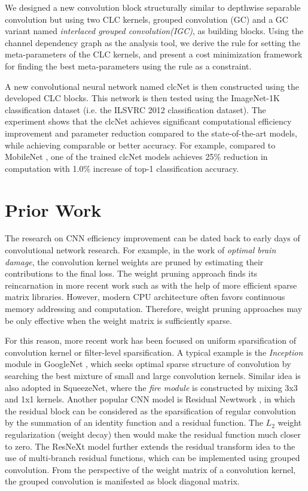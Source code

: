\documentclass[10pt,twocolumn,letterpaper]{article}
\begin{document}
We designed a new convolution block structurally similar to depthwise separable convolution \cite{xception2017chollet} but using two CLC kernels, grouped convolution (GC) and a GC variant named \textit{interlaced grouped convolution(IGC)},  as building blocks. Using the channel dependency graph as the analysis tool, we derive the rule for setting the meta-parameters of the CLC kernels, and present a cost minimization framework for finding the best meta-parameters using the rule as a constraint.

A new convolutional neural network named clcNet is then constructed using the developed CLC blocks. This network is then tested using the ImageNet-1K classification dataset (i.e. the ILSVRC 2012\cite{ilsvrc2015olga} classification dataset). The experiment shows that the clcNet achieves significant computational efficiency improvement and parameter reduction compared to the  state-of-the-art models, while achieving comparable or better accuracy. For example, compared to MobileNet \cite{mobilenet2017howard}, one of the trained clcNet models achieves 25\% reduction in computation with 1.0\% increase of top-1 classification accuracy.
\section{Prior Work}

The research on CNN efficiency improvement can be dated back to early days of convolutional network research. For example, in the work of \textit{optimal brain damage}\cite{prune1990Lecun1990}, the convolution kernel weights are pruned by estimating their contributions to the final loss. The weight pruning approach finds its reincarnation in more recent work such as \cite{compression2015song} with the help of more efficient sparse matrix libraries. However, modern CPU architecture often favors continuous memory addressing and computation. Therefore, weight pruning approaches may be only effective when the weight matrix is sufficiently sparse.

For this reason, more recent work has been focused on uniform sparsification of convolution kernel or filter-level sparsification. A typical example is the \textit{Inception} module in GoogleNet \cite{inception2015szegedy}, which seeks optimal sparse structure of convolution by searching the best mixture of small and large convolution kernels. Similar idea is also adopted in SqueezeNet\cite{squeezenet2016iandola}, where the \textit{fire module }is constructed by mixing 3x3 and 1x1 kernels. Another popular CNN model is Residual Newtwork \cite{resnet2016he}, in which the residual block can be considered as the sparsification of regular convolution by the summation of an identity function and a residual function. The $L_2$ weight regularization (weight decay) then would make the residual function much closer to zero. The ResNeXt model\cite{resnext2016saining} further extends the residual transform idea to the use of multi-branch residual functions, which can be implemented using grouped convolution. From the perspective of the weight matrix of a convolution kernel, the grouped convolution is manifested as block diagonal matrix. 
\end{document}
